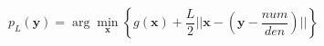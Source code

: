 \documentclass[preview,border=0.3pt]{standalone}
\begin{document}
%
\begin{equation*}
p_L(\mathbf{y}) = \arg\min_\mathbf{x}\left\{ g(\mathbf{x}) + \frac{L}{2}||\mathbf{x} - \left( \mathbf{y} - \frac{num}{den} \right)|| \right\}
\end{equation*}
\end{document}
